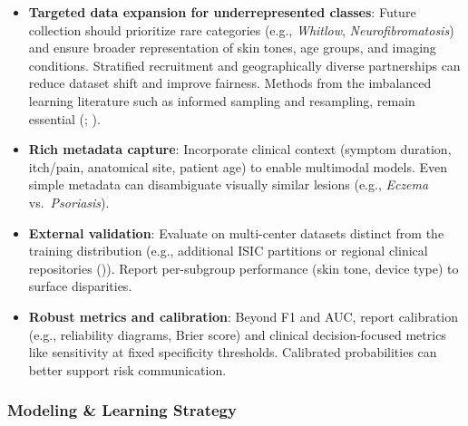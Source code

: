 \documentclass[
  12pt,
  oneside]{article}
\providecommand{\tightlist}{%
  \setlength{\itemsep}{0pt}\setlength{\parskip}{0pt}}
\begin{document}
\begin{itemize}
\tightlist
\item
  \textbf{Targeted data expansion for underrepresented classes}: Future
  collection should prioritize rare categories (e.g., \emph{Whitlow},
  \emph{Neurofibromatosis}) and ensure broader representation of skin
  tones, age groups, and imaging conditions. Stratified recruitment and
  geographically diverse partnerships can reduce dataset shift and
  improve fairness. Methods from the imbalanced learning literature such
  as informed sampling and resampling, remain essential
  (;
  ).
\item
  \textbf{Rich metadata capture}: Incorporate clinical context (symptom
  duration, itch/pain, anatomical site, patient age) to enable
  multimodal models. Even simple metadata can disambiguate visually
  similar lesions (e.g., \emph{Eczema} vs.~\emph{Psoriasis}).
\item
  \textbf{External validation}: Evaluate on multi-center datasets
  distinct from the training distribution (e.g., additional ISIC
  partitions or regional clinical repositories
  ()). Report
  per-subgroup performance (skin tone, device type) to surface
  disparities.
\item
  \textbf{Robust metrics and calibration}: Beyond F1 and AUC, report
  calibration (e.g., reliability diagrams, Brier score) and clinical
  decision-focused metrics like sensitivity at fixed specificity
  thresholds. Calibrated probabilities can better support risk
  communication.
\end{itemize}

\subsubsection{Modeling \& Learning
Strategy}\label{modeling-learning-strategy}
\end{document}
